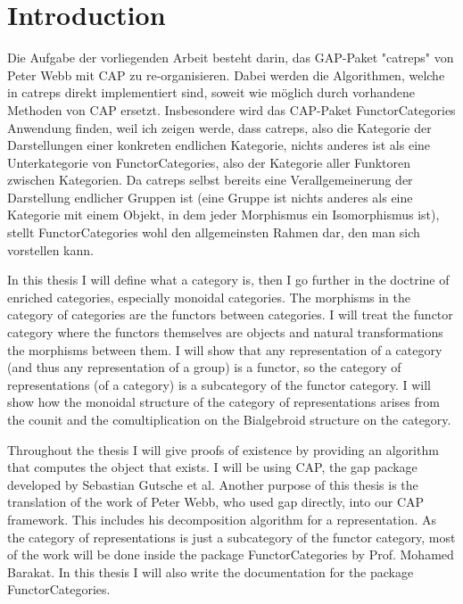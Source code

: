 
\section{Introduction}

Die Aufgabe der vorliegenden Arbeit besteht darin, das GAP-Paket "catreps" von Peter Webb mit CAP zu re-organisieren. Dabei werden die Algorithmen, welche in catreps direkt implementiert sind, soweit wie möglich durch vorhandene Methoden von CAP ersetzt.
Insbesondere wird das CAP-Paket FunctorCategories Anwendung finden, weil ich zeigen werde, dass catreps, also die Kategorie der Darstellungen einer konkreten endlichen Kategorie, nichts anderes ist als eine Unterkategorie von FunctorCategories, also der Kategorie aller Funktoren zwischen Kategorien. 
Da catreps selbst bereits eine Verallgemeinerung der Darstellung endlicher Gruppen ist (eine Gruppe ist nichts anderes als eine Kategorie mit einem Objekt, in dem jeder Morphismus ein Isomorphismus ist), stellt FunctorCategories wohl den allgemeinsten Rahmen dar, den man sich vorstellen kann.

In this thesis I will define what a category is, then I go further in the doctrine of enriched categories, especially monoidal categories.
The morphisms in the category of categories are the functors between categories. I will treat the functor category where the functors themselves are
objects and natural transformations the morphisms between them. I will show that any representation of a category (and thus any representation
of a group) is a functor, so the category of representations (of a category) is a subcategory of the functor category.
I will show how the monoidal structure of the category of representations arises from the counit and the comultiplication on the Bialgebroid structure
on the category.

\noindent Throughout the thesis I will give proofs of existence by providing an algorithm that computes the object that exists. I will be using CAP, the gap package
developed by Sebastian Gutsche et al. Another purpose of this thesis is the translation of the work of Peter Webb, who used gap directly, into our CAP
framework. This includes his decomposition algorithm for a representation. As the category of representations is just a subcategory of the functor category,
most of the work will be done inside the package FunctorCategories by Prof. Mohamed Barakat. In this thesis I will also write the documentation for the
package FunctorCategories.
